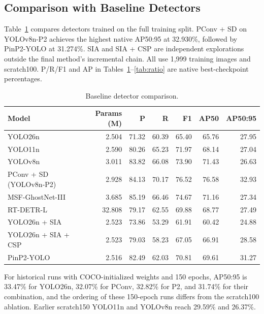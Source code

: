 \documentclass[lettersize,journal]{IEEEtran}
\begin{document}
\subsection{Comparison with Baseline Detectors}
Table~\ref{tab:comparison} compares detectors trained on the full training split. PConv + SD on YOLOv8n-P2 achieves the highest native AP50:95 at 32.930\%, followed by PinP2-YOLO at 31.274\%. SIA and SIA + CSP are independent explorations outside the final method's incremental chain. All use 1,999 training images and scratch100. P/R/F1 and AP in Tables~\ref{tab:comparison}--\ref{tab:ratio} are native best-checkpoint percentages.
\begin{table}[!t]
\caption{Baseline detector comparison.}
\label{tab:comparison}
\centering\footnotesize
\setlength{\tabcolsep}{4pt}
\begin{tabular}{lrrrrrr}
\hline
Model & Params (M) & P & R & F1 & AP50 & AP50:95\\
\hline
YOLO26n & 2.504 & 71.32 & 60.39 & 65.40 & 65.76 & 27.95\\
YOLO11n & 2.590 & 80.26 & 65.23 & 71.97 & 68.14 & 27.04\\
YOLOv8n & 3.011 & 83.82 & 66.08 & 73.90 & 71.43 & 26.63\\
PConv + SD (YOLOv8n-P2) & 2.928 & 84.13 & 70.17 & 76.52 & 76.58 & 32.93\\
MSF-GhostNet-III & 3.685 & 85.19 & 66.46 & 74.67 & 71.16 & 27.34\\
RT-DETR-L & 32.808 & 79.17 & 62.55 & 69.88 & 68.77 & 27.49\\
YOLO26n + SIA & 2.523 & 73.86 & 53.29 & 61.91 & 60.42 & 24.88\\
YOLO26n + SIA + CSP & 2.523 & 79.03 & 58.23 & 67.05 & 66.91 & 28.58\\
PinP2-YOLO & 2.516 & 82.49 & 62.03 & 70.81 & 69.61 & 31.27\\
\hline
\end{tabular}
\end{table}

For historical runs with COCO-initialized weights and 150 epochs, AP50:95 is 33.47\% for YOLO26n, 32.07\% for PConv, 32.82\% for P2, and 31.74\% for their combination, and the ordering of these 150-epoch runs differs from the scratch100 ablation. Earlier scratch150 YOLO11n and YOLOv8n reach 29.59\% and 26.37\%.
\end{document}
